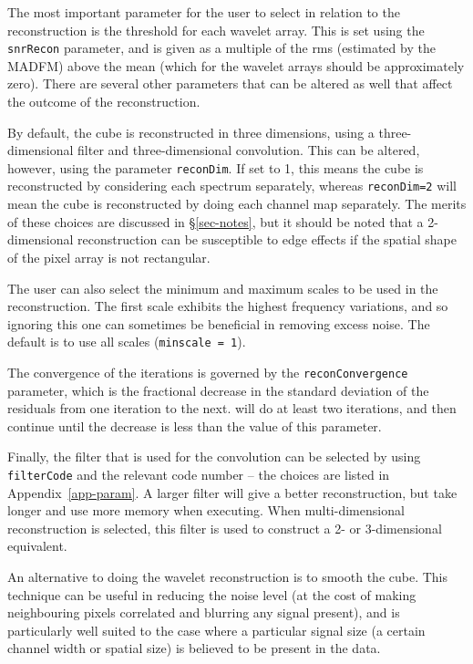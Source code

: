 
The most important parameter for the user to select in relation to the
reconstruction is the threshold for each wavelet array. This is set
using the \texttt{snrRecon} parameter, and is given as a multiple of
the rms (estimated by the MADFM) above the mean (which for the wavelet
arrays should be approximately zero). There are several other
parameters that can be altered as well that affect the outcome of the
reconstruction.

By default, the cube is reconstructed in three dimensions, using a
three-dimensional filter and three-dimensional convolution. This can be
altered, however, using the parameter \texttt{reconDim}. If set to 1,
this means the cube is reconstructed by considering each spectrum
separately, whereas \texttt{reconDim=2} will mean the cube is
reconstructed by doing each channel map separately. The merits of
these choices are discussed in \S\ref{sec-notes}, but it should be
noted that a 2-dimensional reconstruction can be susceptible to edge
effects if the spatial shape of the pixel array is not rectangular.

The user can also select the minimum and maximum scales to be used in
the reconstruction. The first scale exhibits the highest frequency
variations, and so ignoring this one can sometimes be beneficial in
removing excess noise. The default is to use all scales
(\texttt{minscale = 1}).

The convergence of the \atrous iterations is governed by the
\texttt{reconConvergence} parameter, which is the fractional decrease
in the standard deviation of the residuals from one iteration to the
next. \duchamp will do at least two iterations, and then continue
until the decrease is less than the value of this parameter.

Finally, the filter that is used for the convolution can be selected
by using \texttt{filterCode} and the relevant code number -- the
choices are listed in Appendix~\ref{app-param}. A larger filter will
give a better reconstruction, but take longer and use more memory when
executing. When multi-dimensional reconstruction is selected, this
filter is used to construct a 2- or 3-dimensional equivalent.

\label{sec-smoothing}

An alternative to doing the wavelet reconstruction is to smooth the
cube.  This technique can be useful in reducing the noise level (at
the cost of making neighbouring pixels correlated and blurring any
signal present), and is particularly well suited to the case where a
particular signal size (\ie a certain channel width or spatial size)
is believed to be present in the data.

